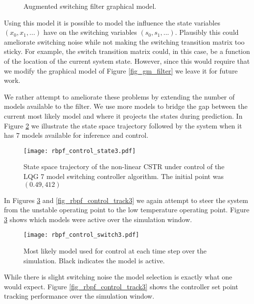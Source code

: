 \begin{enumerate}
\begin{figure}[H]
\caption{Augmented switching filter graphical model.}
\label{fig_gm_augmented}
\end{figure}
Using this model it is possible to model the influence the state variables $(x_0,x_1,...)$ have on the switching variables $(s_0, s_1,...)$. Plausibly this could ameliorate switching noise while not making the switching transition matrix too sticky. For example, the switch transition matrix could, in this case, be a function of the location of the current system state. However, since this would require that we modify the graphical model of Figure \ref{fig_gm_filter} we leave it for future work.
\end{enumerate}
We rather attempt to ameliorate these problems by extending the number of models available to the filter. We use more models to bridge the gap between the current most likely model and where it projects the states during prediction. In Figure \ref{fig_rbpf_control_state3} we illustrate the state space trajectory followed by the system when it has 7 models available for inference and control.
\begin{figure}[H] 
\centering
\texttt{[image: rbpf\_control\_state3.pdf]}
\caption{State space trajectory of the non-linear CSTR under control of the LQG 7 model switching controller algorithm. The initial point was $(0.49, 412)$}
\label{fig_rbpf_control_state3}
\end{figure}
In Figures \ref{fig_rbpf_control_switch3} and \ref{fig_rbpf_control_track3} we again attempt to steer the system from the unstable operating point to the low temperature operating point. Figure \ref{fig_rbpf_control_switch3} shows which models were active over the simulation window.
\begin{figure}[H] 
\centering
\texttt{[image: rbpf\_control\_switch3.pdf]}
\caption{Most likely model used for control at each time step over the simulation. Black indicates the model is active.}
\label{fig_rbpf_control_switch3}
\end{figure}
While there is slight switching noise the model selection is exactly what one would expect. Figure \ref{fig_rbpf_control_track3} shows the controller set point tracking performance over the simulation window.
